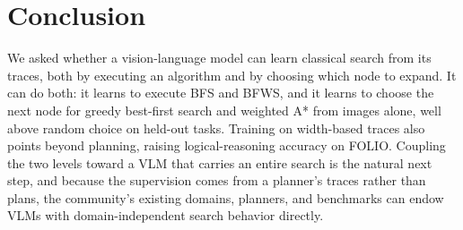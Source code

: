 \section{Conclusion}
\label{sec:conclusion}

We asked whether a vision-language model can learn classical search from its traces, both by executing an algorithm and by choosing which node to expand. It can do both: it learns to execute BFS and BFWS, and it learns to choose the next node for greedy best-first search and weighted A* from images alone, well above random choice on held-out tasks. Training on width-based traces also points beyond planning, raising logical-reasoning accuracy on FOLIO. Coupling the two levels toward a VLM that carries an entire search is the natural next step, and because the supervision comes from a planner's traces rather than plans, the community's existing domains, planners, and benchmarks can endow VLMs with domain-independent search behavior directly.

